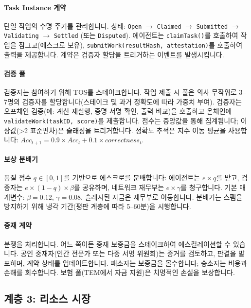 \documentclass[11pt]{article}
\begin{document}
\paragraph{Task Instance 계약} 단일 작업의 수명 주기를 관리합니다. 상태: \texttt{Open} $\rightarrow$ \texttt{Claimed} $\rightarrow$ \texttt{Submitted} $\rightarrow$ \texttt{Validating} $\rightarrow$ \texttt{Settled} (또는 \texttt{Disputed}). 에이전트는 \texttt{claimTask()}를 호출하여 작업을 잠그고(에스크로 보유), \texttt{submitWork(resultHash, attestation)}를 호출하여 출력을 제공합니다. 계약은 검증자 할당을 트리거하는 이벤트를 발생시킵니다.

\paragraph{검증 풀} 검증자는 참여하기 위해 TOS를 스테이크합니다. 작업 제출 시 풀은 의사 무작위로 3--7명의 검증자를 할당합니다(스테이크 및 과거 정확도에 따라 가중치 부여). 검증자는 오프체인 검증(예: 계산 재실행, 증명 서명 확인, 출력 비교)을 호출하고 온체인에 \texttt{validateWork(taskID, score)}를 제출합니다. 점수는 중앙값을 통해 집계됩니다; 이상값(>2 표준편차)은 슬래싱을 트리거합니다. 정확도 추적은 지수 이동 평균을 사용합니다: $Acc_{t+1} = 0.9 \times Acc_t + 0.1 \times correctness_t$.

\paragraph{보상 분배기} 품질 점수 $q \in [0,1]$를 기반으로 에스크로를 분배합니다: 에이전트는 $e \times q$를 받고, 검증자는 $e \times (1-q) \times \beta$를 공유하며, 네트워크 재무부는 $e \times \gamma$를 청구합니다. 기본 매개변수: $\beta=0.12$, $\gamma=0.08$. 슬래시된 자금은 재무부로 이동합니다. 분배기는 스팸을 방지하기 위해 냉각 기간(평판 계층에 따라 5--60분)을 시행합니다.

\paragraph{중재 계약} 분쟁을 처리합니다. 어느 쪽이든 중재 보증금을 스테이크하여 에스컬레이션할 수 있습니다. 공인 중재자(인간 전문가 또는 다중 서명 위원회)는 증거를 검토하고, 판결을 발표하며, 계약 상태를 업데이트합니다. 패소자는 보증금을 몰수합니다; 승소자는 비용과 손해를 회수합니다. 보험 풀(TEM에서 자금 지원)은 치명적인 손실을 보상합니다.

\subsection{계층 3: 리소스 시장}
\end{document}
